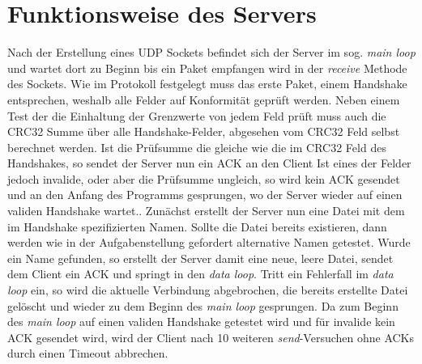 \chapter{Funktionsweise des Servers}

Nach der Erstellung eines UDP Sockets befindet sich der Server im sog. \textit{main loop} und wartet dort zu Beginn bis ein Paket empfangen wird in der \textit{receive} Methode des Sockets.
Wie im Protokoll festgelegt muss das erste Paket, einem Handshake entsprechen, weshalb alle Felder auf Konformität geprüft werden.
Neben einem Test der die Einhaltung der Grenzwerte von jedem Feld prüft muss auch die CRC32 Summe über alle Handshake-Felder, abgesehen vom CRC32 Feld selbst berechnet werden.
Ist die Prüfsumme die gleiche wie die im CRC32 Feld des Handshakes, so sendet der Server nun ein ACK an den Client
Ist eines der Felder jedoch invalide, oder aber die Prüfsumme ungleich, so wird kein ACK gesendet und an den Anfang des Programms gesprungen, wo der Server wieder auf einen validen Handshake wartet..
Zunächst erstellt der Server nun eine Datei mit dem im Handshake spezifizierten Namen.
Sollte die Datei bereits existieren, dann werden wie in der Aufgabenstellung gefordert alternative Namen getestet.
Wurde ein Name gefunden, so erstellt der Server damit eine neue, leere Datei, sendet dem Client ein ACK und springt in den \textit{data loop}.
Tritt ein Fehlerfall im \textit{data loop} ein, so wird die aktuelle Verbindung abgebrochen, die bereits erstellte Datei gelöscht und wieder zu dem Beginn des \textit{main loop} gesprungen.
Da zum Beginn des \textit{main loop} auf einen validen Handshake getestet wird und für invalide kein ACK gesendet wird, wird der Client nach 10 weiteren \textit{send}-Versuchen ohne ACKs durch einen Timeout abbrechen. \newline

